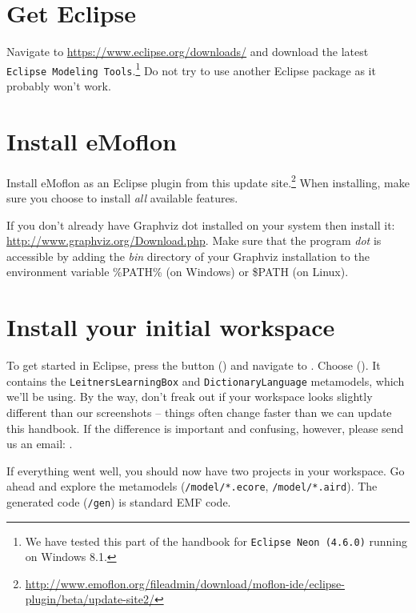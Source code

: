
\section{Get Eclipse}
\label{sec:get-eclipse}

Navigate to \url{https://www.eclipse.org/downloads/} and download the latest \texttt{Eclipse Modeling Tools}.\footnote{We have tested this part of the handbook for \texttt{Eclipse Neon (4.6.0)} running on Windows 8.1.}
Do not try to use another Eclipse package as it probably won't work.

\section{Install eMoflon}
\label{sec:get-emoflon}

Install eMoflon as an Eclipse plugin from this update site.\footnote{\url{http://www.emoflon.org/fileadmin/download/moflon-ide/eclipse-plugin/beta/update-site2/}}
When installing, make sure you choose to install \emph{all} available features.

If you don't already have Graphviz dot installed on your system then install it:
\url{http://www.graphviz.org/Download.php}.
Make sure that the program \emph{dot} is accessible by adding the \emph{bin} directory of your Graphviz installation to the environment variable \%PATH\% (on Windows) or \$PATH (on Linux).

\section{Install your initial workspace}
\label{sec:loadSourceMeta}

To get started in Eclipse, press the  button (\eMoflonMenuButton) and navigate to .
Choose  ().
It contains the \texttt{Leitners\-Learning\-Box} and \texttt{Dictionary\-Language} metamodels, which we'll be using. 
By the way, don't freak out if your workspace looks slightly different than our screenshots -- things often change faster than we can update this handbook.
If the difference is important and confusing, however, please send us an email:  \emoflonMail.

If everything went well, you should now have two projects in your workspace.  
Go ahead and explore the metamodels (\texttt{/model/*.ecore}, \texttt{/model/*.aird}).
The generated code (\texttt{/gen}) is standard EMF code.

